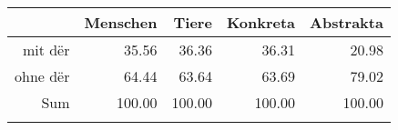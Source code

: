 \begin{tabular}{rrrrr}
  \lsptoprule
 & Menschen & Tiere & Konkreta & Abstrakta \\ 
  \midrule
mit dër & 35.56 & 36.36 & 36.31 & 20.98 \\ 
  ohne dër & 64.44 & 63.64 & 63.69 & 79.02 \\ 
  Sum & 100.00 & 100.00 & 100.00 & 100.00 \\ 
   \lspbottomrule
\end{tabular}
